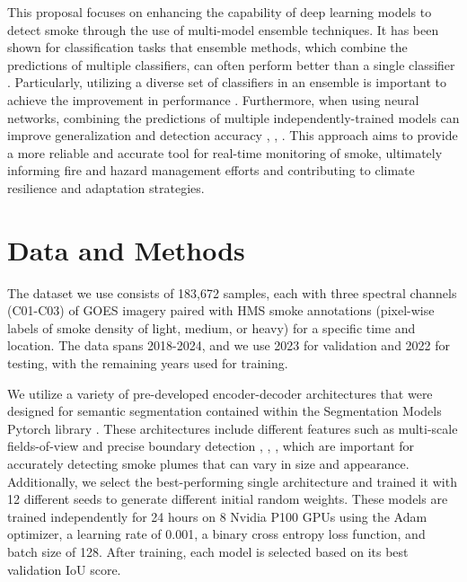 \documentclass{article}
\begin{document}
This proposal focuses on enhancing the capability of deep learning models to detect smoke through the use of multi-model ensemble techniques. It has been shown for classification tasks that ensemble methods, which combine the predictions of multiple classifiers, can often perform better than a single classifier \citep{ensemble-ml}. Particularly, utilizing a diverse set of classifiers in an ensemble is important to achieve the improvement in performance \citep{ensemble-diversity}. Furthermore, when using neural networks, combining the predictions of multiple independently-trained models can improve generalization and detection accuracy \citep{nn-ensemble}, \citep{nn-ensemble2}, \citep{nn-error-ens}. This approach aims to provide a more reliable and accurate tool for real-time monitoring of smoke, ultimately informing fire and hazard management efforts and contributing to climate resilience and adaptation strategies.

\section{Data and Methods}
The dataset we use consists of 183,672 samples, each with three spectral channels (C01-C03) of GOES imagery paired with HMS smoke annotations (pixel-wise labels of smoke density of light, medium, or heavy) for a specific time and location. The data spans 2018-2024, and we use 2023 for validation and 2022 for testing, with the remaining years used for training. 

We utilize a variety of pre-developed encoder-decoder architectures that were designed for semantic segmentation contained within the Segmentation Models Pytorch library \citep{semantic}. These architectures include different features such as multi-scale fields-of-view and precise boundary detection \citep{dlv3p}, \citep{PAN}, \citep{UNetpp}, which are important for accurately detecting smoke plumes that can vary in size and appearance. Additionally, we select the best-performing single architecture and trained it with 12 different seeds to generate different initial random weights. These models are trained independently for 24 hours on 8 Nvidia P100 GPUs using the Adam optimizer, a learning rate of 0.001, a binary cross entropy loss function, and batch size of 128. After training, each model is selected based on its best validation IoU score.
\end{document}
